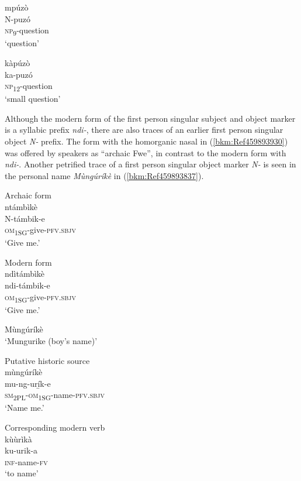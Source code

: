 \ea
\label{bkm:Ref506827044}
\ea
\glll mpúzò\\
N-puzó\\
\textsc{np}\textsubscript{9}-question\\
\glt ‘question’

\ex
\glll kàpúzò\\
ka-puzó\\
\textsc{np}\textsubscript{12}-question\\
\glt ‘small question’
\z\z

Although the modern form of the first person singular subject and object marker is a syllabic prefix \textit{ndi\nobreakdash-}, there are also traces of an earlier first person singular object \textit{N-} prefix. The form with the homorganic nasal in (\ref{bkm:Ref459893930}) was offered by speakers as “archaic Fwe”, in contrast to the modern form with \textit{ndi-}. Another petrified trace of a first person singular object marker \textit{N-} is seen in the per\-sonal name \textit{Mùngúríkè} in (\ref{bkm:Ref459893837}).

\ea
\label{bkm:Ref459893930}
\ea
Archaic form\\
ntámbìkè\\
N-támbik-e\\
\textsc{om}\textsubscript{1SG}-give-\textsc{pfv}.\textsc{sbjv}\\
\glt ‘Give me.’

\ex
Modern form\\
ndìtámbìkè\\
ndi-támbik-e\\
\textsc{om}\textsubscript{1SG}-give-\textsc{pfv}.\textsc{sbjv}\\
\glt ‘Give me.’
\z\z

\ea
\label{bkm:Ref459893837}
\ea
  Mùngúríkè\\
  ‘Mungurike (boy’s name)’

\ex
Putative historic source\\
mùngúríkè\\
mu-ng-urí̲k-e\\
\textsc{sm}\textsubscript{2PL}-\textsc{om}\textsubscript{1SG}-name-\textsc{pfv}.\textsc{sbjv}\\
\glt ‘Name me.’

\ex
Corresponding modern verb\\
kùùrìkà \\
ku-urik-a\\
\textsc{inf}-name-\textsc{fv}\\
\glt ‘to name’
\z\z

